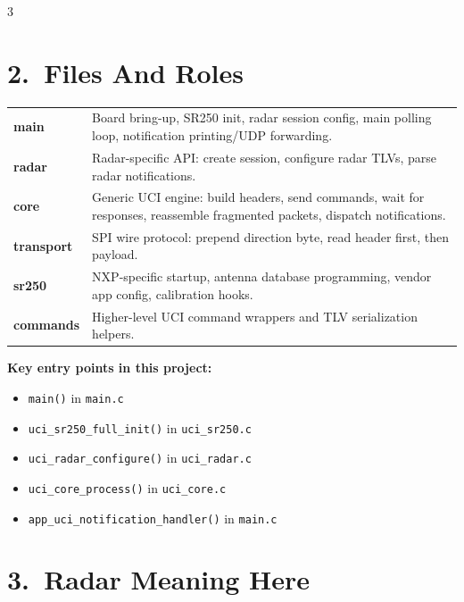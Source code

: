 \documentclass[10pt]{article}
\begin{document}
\begin{multicols*}{3}
\section*{2.\ Files And Roles}

\begin{tcolorbox}[newbox={Code Map}]
\begin{tabular}{@{}p{0.9cm}p{6.9cm}@{}}
\textbf{main} & Board bring-up, SR250 init, radar session config, main polling loop, notification printing/UDP forwarding.\\
\textbf{radar} & Radar-specific API: create session, configure radar TLVs, parse radar notifications.\\
\textbf{core} & Generic UCI engine: build headers, send commands, wait for responses, reassemble fragmented packets, dispatch notifications.\\
\textbf{transport} & SPI wire protocol: prepend direction byte, read header first, then payload.\\
\textbf{sr250} & NXP-specific startup, antenna database programming, vendor app config, calibration hooks.\\
\textbf{commands} & Higher-level UCI command wrappers and TLV serialization helpers.\\
\end{tabular}
\end{tcolorbox}

\textbf{Key entry points in this project:}
\begin{itemize}
  \item \texttt{main()} in \texttt{main.c}
  \item \texttt{uci\_sr250\_full\_init()} in \texttt{uci\_sr250.c}
  \item \texttt{uci\_radar\_configure()} in \texttt{uci\_radar.c}
  \item \texttt{uci\_core\_process()} in \texttt{uci\_core.c}
  \item \texttt{app\_uci\_notification\_handler()} in \texttt{main.c}
\end{itemize}

\section*{3.\ Radar Meaning Here}


\end{multicols*}
\end{document}
